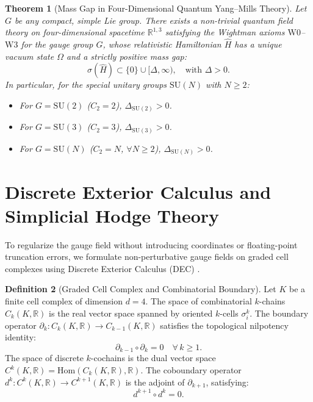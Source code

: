\documentclass[11pt,reqno]{amsart}
\theoremstyle{plain}
\newtheorem{theorem}{Theorem}[section]
\theoremstyle{definition}
\newtheorem{definition}[theorem]{Definition}
\theoremstyle{remark}
\numberwithin{equation}{section}
\begin{document}
\begin{theorem}[Mass Gap in Four-Dimensional Quantum Yang--Mills Theory]
\label{thm:main_mass_gap}
Let $G$ be any compact, simple Lie group. There exists a non-trivial quantum field theory on four-dimensional spacetime $\mathbb{R}^{1,3}$ satisfying the Wightman axioms $\mathrm{W0}$--$\mathrm{W3}$ for the gauge group $G$, whose relativistic Hamiltonian $\hat{H}$ has a unique vacuum state $\Omega$ and a strictly positive mass gap:
\begin{equation}
\sigma(\hat{H}) \subset \{0\} \cup [\Delta, \infty), \quad \text{with } \Delta > 0.
\end{equation}
In particular, for the special unitary groups $\mathrm{SU}(N)$ with $N \ge 2$:
\begin{itemize}
    \item For $G = \mathrm{SU}(2)$ ($C_2 = 2$), $\Delta_{\mathrm{SU}(2)} > 0$.
    \item For $G = \mathrm{SU}(3)$ ($C_2 = 3$), $\Delta_{\mathrm{SU}(3)} > 0$.
    \item For $G = \mathrm{SU}(N)$ ($C_2 = N$, $\forall N \ge 2$), $\Delta_{\mathrm{SU}(N)} > 0$.
\end{itemize}
\end{theorem}

\section{Discrete Exterior Calculus and Simplicial Hodge Theory}
\label{sec:dec}

To regularize the gauge field without introducing coordinates or floating-point truncation errors, we formulate non-perturbative gauge fields on graded cell complexes using Discrete Exterior Calculus (DEC) \cite{Desbrun2005, Forman1998}.

\begin{definition}[Graded Cell Complex and Combinatorial Boundary]
Let $K$ be a finite cell complex of dimension $d = 4$. The space of combinatorial $k$-chains $C_k(K, \mathbb{R})$ is the real vector space spanned by oriented $k$-cells $\sigma_i^k$. The boundary operator $\partial_k : C_k(K, \mathbb{R}) \to C_{k-1}(K, \mathbb{R})$ satisfies the topological nilpotency identity:
\begin{equation}
\partial_{k-1} \circ \partial_k = 0 \quad \forall \, k \ge 1.
\end{equation}
The space of discrete $k$-cochains is the dual vector space $C^k(K, \mathbb{R}) = \mathrm{Hom}(C_k(K, \mathbb{R}), \mathbb{R})$. The coboundary operator $d^k : C^k(K, \mathbb{R}) \to C^{k+1}(K, \mathbb{R})$ is the adjoint of $\partial_{k+1}$, satisfying:
\begin{equation}
d^{k+1} \circ d^k = 0.
\end{equation}
\end{definition}
\end{document}
